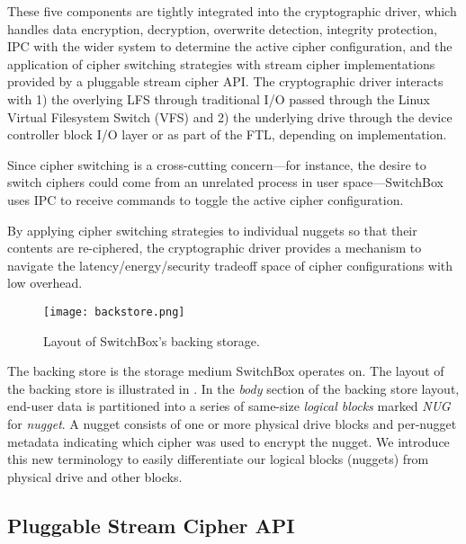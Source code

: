 These five components are tightly integrated into the cryptographic driver,
which handles data encryption, decryption, overwrite detection, integrity
protection, IPC with the wider system to determine the active cipher
configuration, and the application of cipher switching strategies with stream
cipher implementations provided by a pluggable stream cipher API. The
cryptographic driver interacts with 1) the overlying LFS through traditional I/O
passed through the Linux Virtual Filesystem Switch (VFS) and 2) the underlying
drive through the device controller block I/O layer or as part of the FTL,
depending on implementation.

Since cipher switching is a cross-cutting concern---for instance, the desire to
switch ciphers could come from an unrelated process in user space---SwitchBox
uses IPC to receive commands to toggle the active cipher configuration. 

By applying cipher switching strategies to individual nuggets so that their
contents are re-ciphered, the cryptographic driver provides a mechanism to
navigate the latency/energy/security tradeoff space of cipher configurations
with low overhead.

\begin{figure}[t]
\centering
\texttt{[image: backstore.png]}
 \caption{Layout of SwitchBox's backing storage.}\label{fig:backstore2}
\end{figure}

The backing store is the storage medium SwitchBox operates on. The layout of the
backing store is illustrated in . In the \textit{body}
section of the backing store layout, end-user data is partitioned into a series
of same-size \emph{logical blocks} marked \textit{NUG} for \emph{nugget}. A
nugget consists of one or more physical drive blocks and per-nugget metadata
indicating which cipher was used to encrypt the nugget. We introduce this new
terminology to easily differentiate our logical blocks (nuggets) from physical
drive and other blocks.

\subsection{Pluggable Stream Cipher API}

